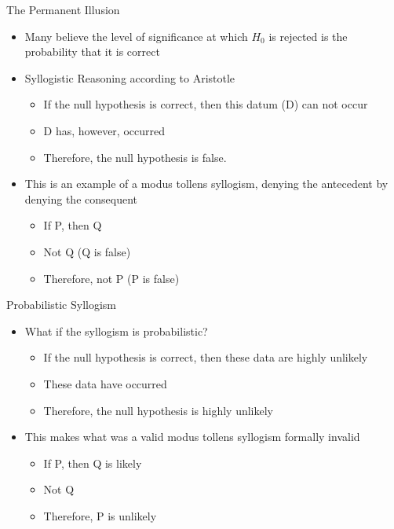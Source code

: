 \documentclass[aspectratio=169, 12pt]{beamer}
\begin{document}
\begin{frame}{The Permanent Illusion}
  \begin{itemize}
  \item Many believe the level of significance at which $H_0$ is rejected is the probability that it is correct 
  \item Syllogistic Reasoning according to Aristotle
	 \begin{itemize}
 	 \item If the null hypothesis is correct, then this datum (D) can not occur
	 \item D has, however, occurred
          \item Therefore, the null hypothesis is false.
 	 \end{itemize}
\item This is an example of a modus tollens syllogism, denying the antecedent by denying the consequent
	 \begin{itemize}
 	 \item If P, then Q 
	 \item Not Q (Q is false)
          \item Therefore, not P (P is false)
 	 \end{itemize}
  \end{itemize}
\end{frame}

\begin{frame}{Probabilistic Syllogism}
  \begin{itemize}
  \item What if the syllogism is probabilistic?
    \begin{itemize}
    \item If the null hypothesis is correct, then these data are highly unlikely
    \item These data have occurred
    \item Therefore, the null hypothesis is highly unlikely
    \end{itemize}
  \item This makes what was a valid modus tollens syllogism formally invalid %
	 \begin{itemize}
 	 \item If P, then Q is likely
	 \item Not Q
          \item Therefore, P is unlikely
 	 \end{itemize}
  \end{itemize}
\end{frame}
\end{document}
